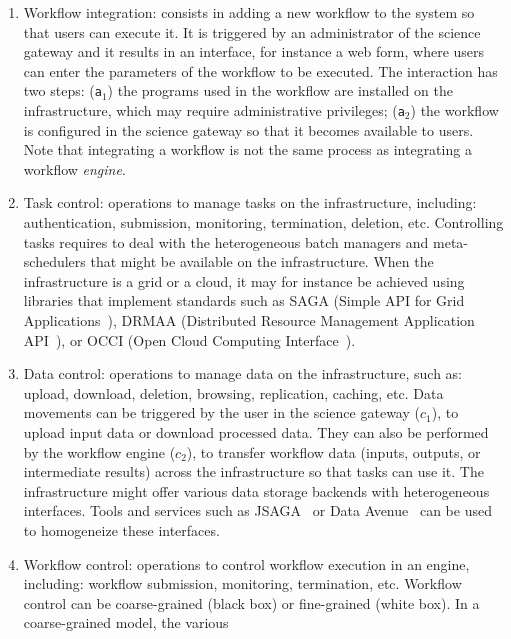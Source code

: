 \documentclass[preprint,3p,twocolumn]{elsarticle}
\begin{document}
\begin{enumerate}[leftmargin=0cm,itemindent=0.65cm,label=\texttt{(\alph*)}]

\item Workflow integration: consists in adding a new workflow to the
  system so that users can execute it. It is triggered by an
  administrator of the science gateway and it results in an interface,
  for instance a web form, where users can enter the parameters of the
  workflow to be executed. The interaction has two steps:
  (\texttt{a$_1$}) the programs used in the workflow are installed on
  the infrastructure, which may require administrative privileges;
  (\texttt{a$_2$}) the workflow is configured in the science gateway
  so that it becomes available to users. Note that integrating a
  workflow is not the same process as integrating a workflow
  \emph{engine}.
\item Task control: operations to manage tasks on the infrastructure,
  including: authentication, submission, monitoring, termination,
  deletion, etc. Controlling tasks requires to deal with the
  heterogeneous batch managers and meta-schedulers that might be
  available on the infrastructure. When the infrastructure is a grid
  or a cloud, it may for instance be achieved using libraries that
  implement standards such as SAGA (Simple API for Grid
  Applications~\cite{goodale2006saga}), DRMAA (Distributed Resource
  Management Application API~\cite{troger2012distributed}), or OCCI
  (Open Cloud Computing Interface~\cite{edmonds2012toward}).
\item Data control: operations to manage data on the infrastructure,
  such as: upload, download, deletion, browsing, replication, caching,
  etc. Data movements can be triggered by the user in the science
  gateway (\texttt{$c_1$}), to upload input data or download processed
  data. They can also be performed by the workflow engine
  (\texttt{$c_2$}), to transfer workflow data (inputs, outputs, or
  intermediate results) across the infrastructure so that tasks can
  use it. The infrastructure might offer various data storage backends
  with heterogeneous interfaces. 
  Tools and services such as JSAGA~\cite{reynaud2010uniform} or Data Avenue~\cite{hajnal2014data}
  can be used to homogeneize these interfaces.
\item Workflow control: operations to control workflow execution in an
  engine, including: workflow submission, monitoring, termination,
  etc. Workflow control can be coarse-grained (black box) or
  fine-grained (white box). In a coarse-grained model, the various

\end{enumerate}
\end{document}

